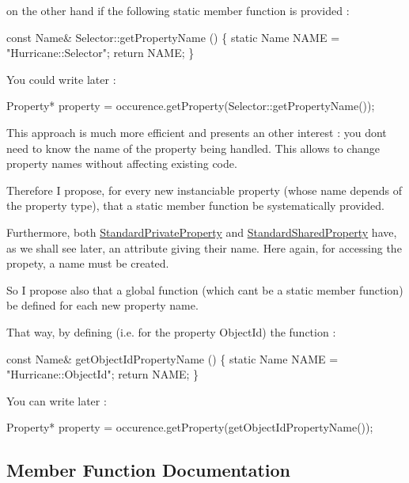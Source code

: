 on the other hand if the following static member function is provided \+: 
\begin{DoxyCode}
\textcolor{keyword}{const} Name& Selector::getPropertyName ()
\{
  \textcolor{keyword}{static} Name NAME = \textcolor{stringliteral}{"Hurricane::Selector"};
  \textcolor{keywordflow}{return} NAME;
\}
\end{DoxyCode}
 You could write later \+: 
\begin{DoxyCode}
Property* \textcolor{keyword}{property} = occurence.getProperty(Selector::getPropertyName());
\end{DoxyCode}
 This approach is much more efficient and presents an other interest \+: you don\textquotesingle{}t need to know the name of the property being handled. This allows to change property names without affecting existing code.

Therefore I propose, for every new instanciable property (whose name depends of the property type), that a static member function be systematically provided.

Furthermore, both \mbox{\hyperlink{classHurricane_1_1StandardPrivateProperty}{Standard\+Private\+Property}} and \mbox{\hyperlink{classHurricane_1_1StandardSharedProperty}{Standard\+Shared\+Property}} have, as we shall see later, an attribute giving their name. Here again, for accessing the propety, a name must be created.

So I propose also that a global function (which can\textquotesingle{}t be a static member function) be defined for each new property name.

That way, by defining (i.\+e. for the property Object\+Id) the function \+: 
\begin{DoxyCode}
\textcolor{keyword}{const} Name& getObjectIdPropertyName ()
\{
  \textcolor{keyword}{static} Name NAME = \textcolor{stringliteral}{"Hurricane::ObjectId"};
  \textcolor{keywordflow}{return} NAME;
\}
\end{DoxyCode}
 You can write later \+: 
\begin{DoxyCode}
Property* \textcolor{keyword}{property} = occurence.getProperty(getObjectIdPropertyName());
\end{DoxyCode}
 

\subsection{Member Function Documentation}
\mbox{\label{classHurricane_1_1Property_ab60362699e6c6ea35ace45dbd1075a2f}} 
